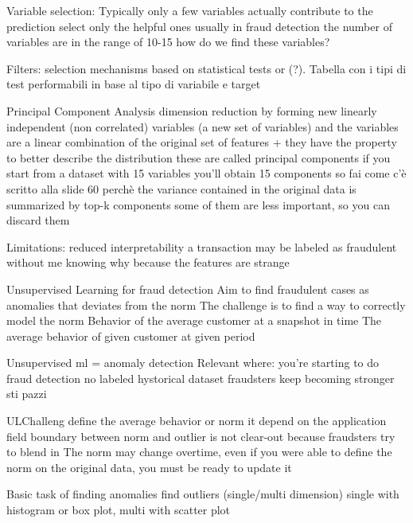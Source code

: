         Variable selection:
            Typically only a few variables actually contribute to the prediction
            select only the helpful ones 
            usually in fraud detection the number of variables are in the range of 10-15
            how do we find these variables?
        
            Filters:
                selection mechanisms based on statistical tests or (?).
                Tabella con i tipi di test performabili in base al tipo di variabile e target 

            Principal Component Analysis 
                dimension reduction by forming new linearly independent (non correlated) variables (a new set of variables)
                and the variables are a linear combination of the original set of features 
                + they have the property to better describe the distribution 
                these are called principal components 
                if you start from a dataset with 15 variables you'll obtain 15 components 
                so fai come c'è scritto alla slide 60
                perchè the variance contained in the original data is summarized by top-k components 
                some of them are less important, so you can discard them 

                Limitations:
                    reduced interpretability 
                        a transaction may be labeled as fraudulent without me knowing why because the features are strange 

Unsupervised Learning for fraud detection 
    Aim to find fraudulent cases as anomalies that deviates from the norm 
    The challenge is to find a way to correctly model the norm 
        Behavior of the average customer at a snapshot in time 
        The average behavior of given customer at given period
    
    Unsupervised ml = anomaly detection 
        Relevant where:
            you're starting to do fraud detection 
            no labeled hystorical dataset 
            fraudsters keep becoming stronger sti pazzi 

    ULChalleng
        define the average behavior or norm 
            it depend on the application field 
            boundary between norm and outlier is not clear-out because fraudsters try to blend in 
            The norm may change overtime, even if you were able to define the norm on the original data, you must be ready to update it
    
    Basic task of finding anomalies 
        find outliers (single/multi dimension) single with histogram or box plot, multi with scatter plot 

